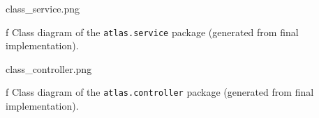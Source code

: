 \midinsert
\picw=11cm  \cinspic class_service.png
\caption/f Class diagram of the {\tt atlas.service} package (generated from final implementation).
\endinsert

\midinsert
\picw=13cm  \cinspic class_controller.png
\caption/f Class diagram of the {\tt atlas.controller} package (generated from final implementation).
\endinsert
